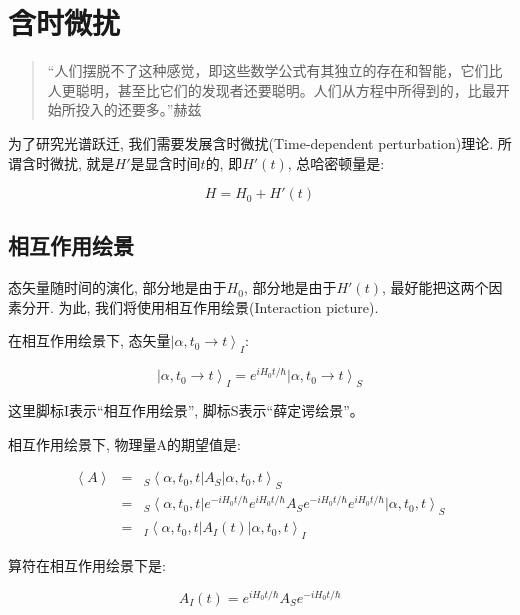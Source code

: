 \section{含时微扰}

\begin{quotation}
“人们摆脱不了这种感觉，即这些数学公式有其独立的存在和智能，它们比人更聪明，甚至比它们的发现者还要聪明。人们从方程中所得到的，比最开始所投入的还要多。”\qquad 赫兹
\end{quotation}

为了研究光谱跃迁, 我们需要发展含时微扰(Time-dependent
perturbation)理论. 所谓含时微扰, 就是$H'$是显含时间$t$的, 即$H'(t)$,
总哈密顿量是:

\begin{equation*}
H = H_0 + H'(t)
\end{equation*}

\subsection{相互作用绘景}

态矢量随时间的演化, 部分地是由于$H_0$, 部分地是由于$H'(t)$,
最好能把这两个因素分开. 为此, 我们将使用相互作用绘景(Interaction
picture).

在相互作用绘景下, 态矢量$\left| \alpha, t_0 \to t \right\rangle_I$:


\begin{equation*}
\left| \alpha, t_0 \to t \right\rangle_I = e^{iH_0t/\hbar} \left|
\alpha, t_0 \to t \right\rangle_S
\end{equation*}


这里脚标I表示``相互作用绘景'', 脚标S表示``薛定谔绘景''。

相互作用绘景下, 物理量A的期望值是:

\begin{eqnarray*}
\left\langle A \right\rangle &=& {}_S\left\langle \alpha, t_0, t
\right| A_S \left| \alpha, t_0, t \right\rangle_S \\
  {} &=& {}_S\left\langle \alpha, t_0, t \right|e^{-iH_0t/\hbar}
e^{iH_0t/\hbar} A_S e^{-iH_0t/\hbar} e^{iH_0t/\hbar} \left| \alpha,
t_0, t \right\rangle_S\\
 {} &=& {}_I\left\langle \alpha, t_0,t \right|A_I(t) \left|\alpha, t_0,t  \right\rangle_I
\end{eqnarray*}

算符在相互作用绘景下是:

\begin{equation*}
A_I(t)=e^{iH_0t/\hbar} A_S e^{-iH_0t/\hbar}
\end{equation*}

